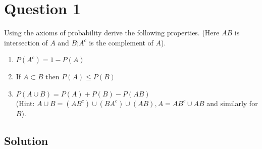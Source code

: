 \section*{Question 1}

Using the axioms of probability derive the following properties.
(Here \(AB\) is intersection of \(A\) and \(B\);\@ \(A^c\) is the complement of \(A\)).

\begin{enumerate}[label = (\alph*)]
    \item \( P(A^c)=1 - P(A) \)
    \item If \( A \subset B \) then \( P(A) \leq P(B) \)
    \item \( P(A\cup B)=P(A)+P(B)-P(AB) \) \\
          (Hint: \( A\cup B = (AB^c)\cup(BA^c)\cup(AB), A = AB^c \cup AB \) and similarly for \( B \)).
\end{enumerate}

\subsection*{Solution}
